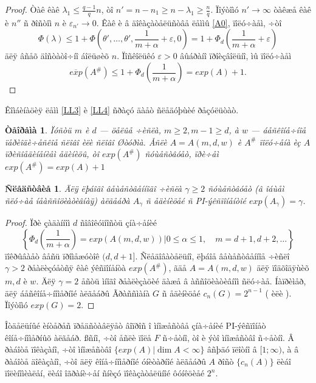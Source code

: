 \documentclass{article}
\numberwithin{equation}{section}
\theoremstyle{plain}
\newtheorem{theorem}{Òåîðåìà}
\newtheorem{corollary}{Ñëåäñòâèå}
\theoremstyle{definition}
\newtheorem{proof}{Äîêàçàòåëüñòâî}
\begin{document}
\begin{fulltext}
\begin{proof}
Òàê êàê $\lambda_1 \le\frac{q-1}{q}n$, òî $n'=n-n_1\ge n-\lambda_1\ge \frac{n}{q}$.
Ïîýòîìó $n'\to\infty$ òàêæå êàê è $n''$ ñ ðîñòîì $n$ è $\varepsilon_{n'}\to 0$. 
Êàê è â äîêàçàòåëüñòâå ëåììû \ref{A0}, ïîëó÷àåì, ÷òî
$$
\Phi(\lambda) \le 1+\Phi(\theta',\ldots,\theta',\frac{1}{m+\alpha}+\varepsilon,0)=
1+\Phi_d(\frac{1}{m+\alpha}+\varepsilon)
$$
äëÿ âñåõ äîñòàòî÷íî áîëüøèõ $n$. Ïîñêîëüêó $\varepsilon >0$ âûáðàíî ïðîèçâîëüíî, ìû ïîëó÷àåì
$$
\overline{exp}(A^\#) \le 1+\Phi_d(\frac{1}{m+\alpha})= exp(A)+1.
$$

 \end{proof}

Êîìáèíàöèÿ ëåìì \ref{LL3} è \ref{LL4} ñðàçó äàåò ñëåäóþùèé ðåçóëüòàò.

\begin{theorem}\label{t2}
Ïóñòü $m$ è $d$ --- öåëûå ÷èñëà, $m\ge 2, m-1\ge d$, à $w$ --- áåñêîíå÷íîå ïåðèîäè÷åñêîå ñëîâî
èëè ñëîâî Øòóðìà. Åñëè $A=A(m,d,w)$ è $A^\#$ ïîëó÷åíà èç $A$ ïðèñîåäèíåíèåì  åäèíèöû, òî
$exp(A^\#)$ ñóùåñòâóåò, ïðè÷åì $exp(A^\#)=exp(A)+1$
\end{theorem}

\begin{corollary}\label{c1}
Äëÿ ëþáîãî âåùåñòâåííîãî ÷èñëà $\gamma\ge 2$ ñóùåñòâóåò 
(â îáùåì ñëó÷àå íåàññîöèàòèâíàÿ) àëãåáðà  $A_\gamma$ ñ
åäèíèöåé ñ PI-ýêñïîíåíòîé $exp(A_\gamma)=\gamma$.
\end{corollary}

\begin{proof}
Ïðè çàäàííîì $d$ ñîâîêóïíîñòü çíà÷åíèé
$$
\left\lbrace \Phi_d(\frac{1}{m+\alpha})=exp(A(m,d,w)) \vert 0\le\alpha\le 1,
\quad m=d+1, d+2,\ldots\right\rbrace
$$
ïîêðûâàåò âåñü ïðîìåæóòîê $(d,d+1]$. Ñëåäîâàòåëüíî, ëþáîå âåùåñòâåííîå ÷èñëî $\gamma>2$
ðåàëèçóåòñÿ êàê ýêñïîíåíòà $exp(A^\#)$, ãäå $A=A(m,d,w)$ äëÿ ïîäõîäÿùèõ $m,d$ è $w$.
Äëÿ $\gamma=2$ åñòü ìíîãî ðåàëèçàöèé äàæå â àññîöèàòèâíîì ñëó÷àå. Íàïðèìåð, äëÿ áåñêîíå÷íîìåðíîé àëãåáðû Ãðàññìàíà $G$ ñ åäèíèöåé $c_n(G)=2^{n-1}$ (\cite{KR} èëè
 \cite[òåîðåìà 4.1.8]{GZbook}). Ïîýòîìó $exp(G)=2$.

\end{proof}

Îòäåëüíûé èíòåðåñ ïðåäñòàâëÿåò âîïðîñ î ìíîæåñòâå çíà÷åíèé PI-ýêñïîíåò êîíå÷íîìåðíûõ
àëãåáð. ßñíî, ÷òî åñëè ïîëå $F$ ñ÷åòíî, òî è ýòî ìíîæåñòâî ñ÷åòíî. Â ðàáîòå \cite{GMZ}
ïîêàçàíî, ÷òî ìíîæåñòâî $\{exp(A)|\dim A <\infty\}$ âñþäó ïëîòíî â $[1;\infty)$, à â ðàáîòå
\cite{Z} äîêàçàíî, ÷òî äëÿ êîíå÷íîìåðíîé óíèòàðíîé àëãåáðû $A$ ðîñò $\{c_n(A)\}$ ëèáî
ïîëèíîìèàëåí, ëèáî îãðàíè÷åí ñíèçó ïîêàçàòåëüíîé ôóíêöèåé $2^n$.


\end{fulltext}
\end{document}
